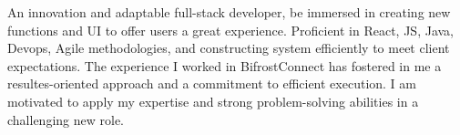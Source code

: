 An innovation and adaptable full-stack developer, be immersed in creating new 
functions and UI to offer users a great experience. Proficient
in React, JS, Java, Devops, Agile methodologies, and constructing
system efficiently to meet client expectations. The experience 
I worked in BifrostConnect has fostered in me a resultes-oriented 
approach and a commitment to efficient execution. I am motivated to 
apply my expertise and strong problem-solving abilities in a challenging
new role.